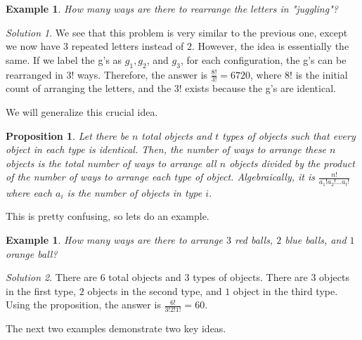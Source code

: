 \documentclass[letterpaper]{article}
\newtheorem{prop}[thm]{Proposition}
\newtheorem{example}[thm]{Example}
\theoremstyle{remark}
\newtheorem*{solution}{Solution}
\theoremstyle{definition}
\begin{document}
\bigskip

\begin{example}
How many ways are there to rearrange the letters in "juggling"?
\end{example}

\begin{solution}
We see that this problem is very similar to the previous one, except we now have $3$ repeated letters instead of $2$. However, the idea is essentially the same. If we label the g's as $g_1, g_2$, and $g_3$, for each configuration, the g's can be rearranged in $3!$ ways. Therefore, the answer is $\frac{8!}{3!}=6720$, where $8!$ is the initial count of arranging the letters, and the $3!$ exists because the g's are identical.
\end{solution}

\bigskip

We will generalize this crucial idea.

\bigskip

\begin{mdframed}
\begin{prop}
Let there be $n$ total objects and $t$ types of objects such that every object in each type is identical. Then, the number of ways to arrange these $n$ objects is the total number of ways to arrange all $n$ objects divided by the product of the number of ways to arrange each type of object. Algebraically, it is $\frac{n!}{a_1! a_2! \dots a_t!}$ where each $a_i$ is the number of objects in type $i$. 
\end{prop}
\end{mdframed}

This is pretty confusing, so lets do an example.

\bigskip

\begin{example}
How many ways are there to arrange $3$ red balls, $2$ blue balls, and $1$ orange ball?
\end{example}

\begin{solution}
There are $6$ total objects and $3$ types of objects. There are $3$ objects in the first type, $2$ objects in the second type, and $1$ object in the third type. Using the proposition, the answer is $\frac{6!}{3!2!1!}=60$.
\end{solution}

\bigskip

The next two examples demonstrate two key ideas.

\bigskip
\end{document}
